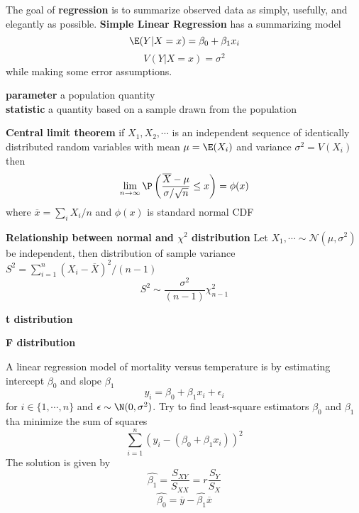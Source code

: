\documentclass[11pt]{article}
\begin{document}
\begin{defn*}
    The goal of \textbf{regression} is to summarize observed data as simply, usefully, and elegantly as possible. \textbf{Simple Linear Regression} has a summarizing model
    \[
        \E(Y | X = x) = \beta_0 + \beta_1 x_i 
    \]
    \[
        V(Y|X = x) = \sigma^2
    \]
    while making some error assumptions. 
\end{defn*}


\begin{defn*}
    \textbf{parameter} a population quantity  \\
    \textbf{statistic} a quantity based on a sample drawn from the population
\end{defn*}


\begin{defn*}
    \textbf{Central limit theorem} if $X_1, X_2, \cdots$ is an independent sequence of identically distributed random variables with mean $\mu = \E(X_i)$ and variance $\sigma^2 = V(X_i)$ then 
    \[
        \lim_{n\to\infty} \P\left( \frac{\overline{X} - \mu}{\sigma / \sqrt{n}} \leq x \right) = \phi(x)
    \]
    where $\overline{x} = \sum_i X_i / n$ and $\phi(x)$ is standard normal CDF
\end{defn*}


\begin{defn*}
    \textbf{Relationship between normal and $\chi^2$ distribution} Let $X_1, \cdots \sim \mathcal{N}(\mu, \sigma^2)$ be independent, then distribution of sample variance $S^2= \sum_{i=1}^n (X_i - \overline{X})^2 / (n-1)$
    \[
        S^2 \sim \frac{\sigma^2}{(n-1)} \chi_{n-1}^2
    \]
\end{defn*}


\begin{defn*}
    \textbf{t distribution} 
\end{defn*}

\begin{defn*}
    \textbf{F distribution}
\end{defn*}



\begin{defn*}
    A linear regression model of mortality versus temperature is by estimating intercept $\beta_0$ and slope $\beta_1$
    \[
        y_i = \beta_0 + \beta_1 x_i + \epsilon_i
    \]
    for $i\in \{ 1, \cdots, n\}$ and $\epsilon \sim \N (0, \sigma^2)$. Try to find least-square estimators $\beta_0$ and $\beta_1$ tha minimize the sum of squares 
    \[
        \sum_{i=1}^n (y_i - (\beta_0 + \beta_1 x_i))^2
    \]
    The solution is given by 
    \[
        \hat{\beta_1} = \frac{S_{XY}}{S_{XX}} = r \frac{S_Y}{S_X}
    \]
    \[
        \hat{\beta_0} = \overline{y} - \hat{\beta_1}\overline{x}
    \]
\end{defn*}
\end{document}
